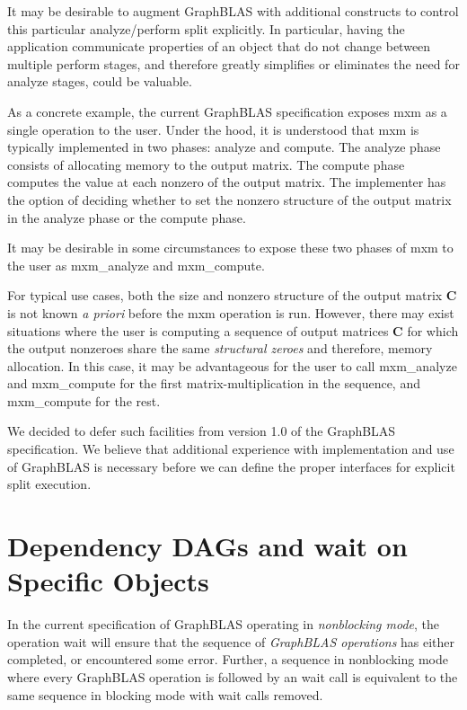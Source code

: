 It may be desirable to augment GraphBLAS with additional constructs to control this particular
analyze/perform split explicitly. In particular, having the application communicate properties of
an object that do not change between multiple perform stages, and therefore greatly simplifies
or eliminates the need for analyze stages, could be valuable.

As a concrete example, the current GraphBLAS specification exposes {\sf mxm} as a single operation to the user. Under the hood, it is understood that {\sf mxm} is typically implemented in two phases: analyze and compute. The analyze phase consists of allocating memory to the output matrix. The compute phase computes the value at each nonzero of the output matrix. The implementer has the option of deciding whether to set the nonzero structure of the output matrix in the analyze phase or the compute phase.

It may be desirable in some circumstances to expose these two phases of {\sf mxm} to the user as {\sf mxm\_analyze} and {\sf mxm\_compute}. 

For typical use cases, both the size and nonzero structure of the output matrix \textbf{C} is not known \emph{a priori} before the {\sf mxm} operation is run. However, there may exist situations where the user is computing a sequence of output matrices \textbf{C} for which the output nonzeroes share the same \emph{structural zeroes} and therefore, memory allocation. In this case, it may be advantageous for the user to call {\sf mxm\_analyze} and {\sf mxm\_compute} for the first matrix-multiplication in the sequence, and {\sf mxm\_compute} for the rest.

We decided to defer such facilities from version 1.0 of the GraphBLAS specification. We believe
that additional experience with implementation and use of GraphBLAS is necessary before
we can define the proper interfaces for explicit split execution.

\section{Dependency DAGs and {\sf wait} on Specific Objects}

In the current specification of GraphBLAS operating in \emph{nonblocking mode}, the operation {\sf wait} will ensure that the sequence of \emph{GraphBLAS operations} has either completed, or encountered some error. Further, a sequence in nonblocking mode where every GraphBLAS operation is followed by an {\sf wait} call is equivalent to the same sequence in blocking mode with {\sf wait} calls removed.

